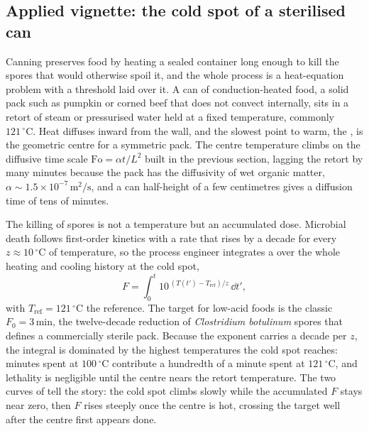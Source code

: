 \subsection{Applied vignette: the cold spot of a sterilised can}

Canning preserves food by heating a sealed container long enough to
kill the spores that would otherwise spoil it, and the whole process
is a heat-equation problem with a threshold laid over it. A can of
conduction-heated food, a solid pack such as pumpkin or corned beef
that does not convect internally, sits in a retort of steam or
pressurised water held at a fixed temperature, commonly
$121\,{}^{\circ}\mathrm{C}$. Heat diffuses inward from the wall, and
the slowest point to warm, the , is the geometric
centre for a symmetric pack. The centre temperature climbs on the
diffusive time scale $\mathrm{Fo} = \alpha t/L^{2}$ built in the
previous section, lagging the retort by many minutes because the pack
has the diffusivity of wet organic matter, $\alpha \sim 1.5 \times
10^{-7}\,\si{\meter\squared\per\second}$, and a can half-height of a
few centimetres gives a diffusion time of tens of minutes.

The killing of spores is not a temperature but an accumulated dose.
Microbial death follows first-order kinetics with a rate that rises
by a decade for every $z \approx 10\,{}^{\circ}\mathrm{C}$ of
temperature, so the process engineer integrates a  over the whole heating and cooling history at the cold spot,
\[
F = \int_{0}^{t} 10^{\,(T(t') - T_{\mathrm{ref}})/z}\, \dd t',
\]
with $T_{\mathrm{ref}} = 121\,{}^{\circ}\mathrm{C}$ the reference. The
target for low-acid foods is the classic $F_{0} = 3\,\si{\minute}$,
the twelve-decade reduction of \textit{Clostridium botulinum} spores
that defines a commercially sterile pack. Because the exponent
carries a decade per $z$, the integral is dominated by the highest
temperatures the cold spot reaches: minutes spent at
$100\,{}^{\circ}\mathrm{C}$ contribute a hundredth of a minute spent
at $121\,{}^{\circ}\mathrm{C}$, and lethality is negligible until the
centre nears the retort temperature. The two curves of
 tell the story: the cold spot
climbs slowly while the accumulated $F$ stays near zero, then $F$
rises steeply once the centre is hot, crossing the target well after
the centre first appears done.



